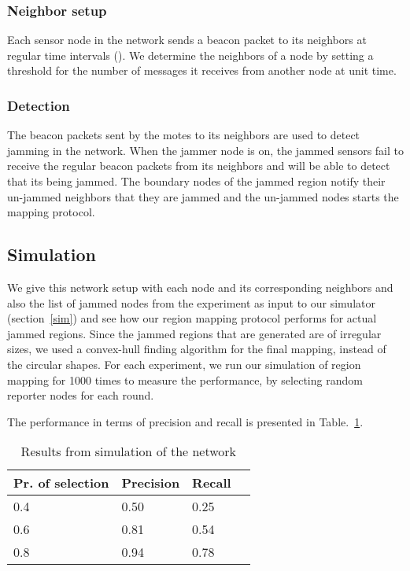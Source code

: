 \documentclass[conference]{IEEEtran}
\begin{document}
\subsubsection{Neighbor setup}
Each sensor node in the network sends a beacon packet to its neighbors at regular time intervals (). We determine the neighbors of a node by setting a threshold for the number of messages it receives from another node at unit time.

\subsubsection{Detection}
The beacon packets sent by the motes to its neighbors are used to detect jamming in the network. When the jammer node is on, the jammed sensors fail to receive the regular beacon packets from its neighbors and will be able to detect that its being jammed. The boundary nodes of the jammed region notify their un-jammed neighbors that they are jammed and the un-jammed nodes starts the mapping protocol. 

\subsection{Simulation}
We give this network setup with each node and its corresponding neighbors and also the list of jammed nodes from the experiment as input to our simulator (section~\ref{sim}) and see how our region mapping protocol performs for actual jammed regions. Since the jammed regions that are generated are of irregular sizes, we used a convex-hull finding algorithm for the final mapping, instead of the circular shapes. For each experiment, we run our simulation of region mapping for 1000 times to measure the performance, by selecting random reporter nodes for each round.

The performance in terms of precision and recall is presented in Table.~\ref{exp_result}.

\begin{table}
\begin{center}
\caption{Results from simulation of the network}
\begin{tabular}{ | l | p{1.5cm}| p{1.5cm} | p{1.5cm}|}
\hline
Pr. of selection & Precision & Recall\\ \hline\hline
0.4 & 0.50 & 0.25\\ \hline
0.6 & 0.81 & 0.54\\ \hline
0.8 & 0.94 & 0.78\\ \hline
\end{tabular}
\label{exp_result}
\end{center}
\end{table}
\end{document}
